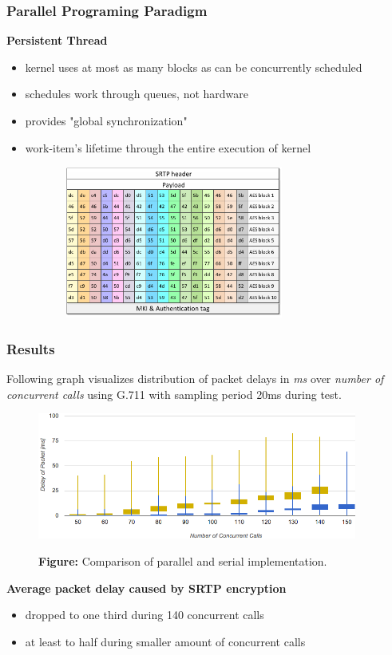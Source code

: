 \documentclass[10pt, xcolor=pdflatex, dvipsnames, table]{beamer}
\begin{document}
\begin{frame}
\frametitle{Parallel Programing Paradigm}
\textbf{Persistent Thread}
\begin{itemize}
\item kernel uses at most as many blocks as can be concurrently scheduled
\item schedules work through queues, not hardware
\item provides "global synchronization"
\item work-item's lifetime through the entire execution of kernel
\end{itemize}

\begin{figure}[H]
\centering
\includegraphics[width=9cm,height=5cm]{img/packet_wi.pdf}
\end{figure}
\end{frame}



\begin{frame}
\frametitle{Results}
\footnotesize{Following graph visualizes distribution of packet delays in \textit{ms} over
\textit{number of concurrent calls} using G.711 with sampling period 20ms during test.}

\begin{figure}[H]
\centering
\includegraphics[width=10.5cm,keepaspectratio]{img/compare.png}

\footnotesize{\textbf{Figure:} Comparison of parallel and serial implementation.}
\end{figure}

\textbf{Average packet delay caused by SRTP encryption}
  \begin{itemize}
    \item dropped to one third during 140 concurrent calls 
    \item at least to half during smaller amount of concurrent calls
  \end{itemize}
\end{frame}
\end{document}
